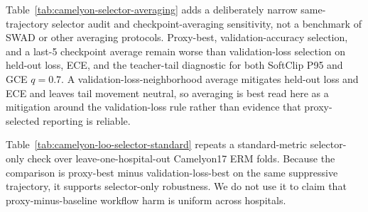 \begin{table}[h]
  \centering
  \scriptsize
  \resizebox{\columnwidth}{!}{}
  \caption{
    Camelyon17 ERM validation-accuracy selector sensitivity.
    Deltas are validation-accuracy-best minus validation-loss-best on the same suppressive trajectory.
    P95, P97, and P99 all worsen held-out loss, ECE, and the fixed-bank teacher-tail diagnostic in $10/10$ seeds.
    Brier is neutral or favorable to validation-accuracy selection, so the claim is restricted to loss, calibration by ECE, and the teacher-tail stress diagnostic.
  }
  \label{tab:camelyon-valacc-selector}
\end{table}

Table~\ref{tab:camelyon-selector-averaging} adds a deliberately narrow same-trajectory selector audit and checkpoint-averaging sensitivity, not a benchmark of SWAD or other averaging protocols.
Proxy-best, validation-accuracy selection, and a last-5 checkpoint average remain worse than validation-loss selection on held-out loss, ECE, and the teacher-tail diagnostic for both SoftClip P95 and GCE $q=0.7$.
A validation-loss-neighborhood average mitigates held-out loss and ECE and leaves tail movement neutral, so averaging is best read here as a mitigation around the validation-loss rule rather than evidence that proxy-selected reporting is reliable.

\begin{table}[h]
  \centering
  \scriptsize
  \resizebox{\columnwidth}{!}{}
  \caption{
    Same-trajectory selector audit and checkpoint-averaging sensitivity on Camelyon17 ERM.
    Rows report policy minus validation-loss-best on the same suppressive objective family and trajectory.
    For both SoftClip P95 and GCE ($q=0.7$), proxy-best, validation-accuracy-best, and last-5 averaging worsen held-out loss, ECE, and the teacher-tail stress diagnostic in $10/10$ seeds, while validation-loss-neighborhood averaging mitigates loss/ECE and leaves tail movement approximately neutral.
    This is a narrow sensitivity on released runs, not a SWAD or Ensemble-of-Averages benchmark.
  }
  \label{tab:camelyon-selector-averaging}
\end{table}

Table~\ref{tab:camelyon-loo-selector-standard} repeats a standard-metric selector-only check over leave-one-hospital-out Camelyon17 ERM folds.
Because the comparison is proxy-best minus validation-loss-best on the same suppressive trajectory, it supports selector-only robustness.
We do not use it to claim that proxy-minus-baseline workflow harm is uniform across hospitals.

